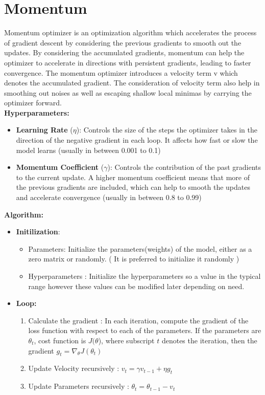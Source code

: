 \documentclass{article}
\begin{document}
\section*{Momentum}
Momentum optimizer is an optimization algorithm which accelerates the process of gradient descent by considering the previous gradients to smooth out the updates. By considering the accumulated gradients, momentum can help the optimizer to accelerate in directions with persistent gradients, leading to faster convergence. The momentum optimizer introduces a velocity term v which denotes the accumulated gradient. The consideration of velocity term also help in smoothing out noises as well as escaping shallow local minimas by carrying the optimizer forward. \\
\textbf{Hyperparameters: }
\begin{itemize}
    \item \textbf{Learning Rate} ($\eta$): Controls the size of the steps the optimizer takes in the direction of the negative gradient in each loop. It affects how fast or slow the model learns (usually in between 0.001 to 0.1)
    \item \textbf{Momentum Coefficient} ($\gamma$): Controls the contribution of the past gradients to the current update. A higher momentum coefficient means that more of the previous gradients are included, which can help to smooth the updates and accelerate convergence (usually in between 0.8 to 0.99)
\end{itemize}
\textbf{Algorithm: }
\begin{itemize}
    \item \textbf{Initilization}:
    \begin{itemize}
        \item Parameters: Initialize the parameters(weights) of the model, either as a zero matrix or randomly. ( It is preferred to initialize it randomly )
        \item Hyperparameters : Initialize the hyperparameters so a value in the typical range however these values can be modified later depending on need.    
    \end{itemize}
    \item \textbf{Loop:}
    \begin{enumerate}
        \item Calculate the gradient : In each iteration, compute the gradient of the loss function with respect to each of the parameters. If the parameters are $\theta_t$, cost function is $J(\theta$), where subscript $t$ denotes the iteration, then the gradient $g_t = \nabla_{\theta} J(\theta_t)$
        \item Update Velocity recursively : 
        $v_t = \gamma v_{t-1} + \eta g_t$
        \item Update Parameters recursively :
        $\theta_t = \theta_{t-1} - v_t$
    \end{enumerate}
\end{itemize}
    
\end{document}
